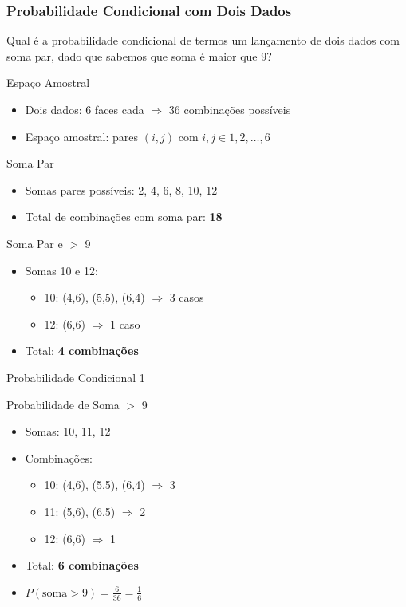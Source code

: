 \documentclass[11pt]{beamer}
\begin{document}
\begin{frame}
\frametitle{Probabilidade Condicional com Dois Dados}

Qual é a probabilidade condicional de termos um lançamento de dois dados com soma par, dado que sabemos que  soma é maior que 9?
\end{frame}

\begin{frame}{Espaço Amostral}
\begin{itemize}
\item Dois dados: 6 faces cada $\Rightarrow$ 36 combinações possíveis
\item Espaço amostral: pares $(i, j)$ com $i, j \in {1, 2, \ldots, 6}$
\end{itemize}
\end{frame}

\begin{frame}{Soma Par}
\begin{itemize}
\item Somas pares possíveis: 2, 4, 6, 8, 10, 12
\item Total de combinações com soma par: \textbf{18}
\end{itemize}
\end{frame}

\begin{frame}{Soma Par e $>$ 9}
\begin{itemize}
\item Somas 10 e 12:
\begin{itemize}
\item 10: (4,6), (5,5), (6,4) $\Rightarrow$ 3 casos
\item 12: (6,6) $\Rightarrow$ 1 caso
\end{itemize}
\item Total: \textbf{4 combinações}
\end{itemize}
\end{frame}

\begin{frame}{Probabilidade Condicional 1}



\end{frame}

\begin{frame}{Probabilidade de Soma $>$ 9}
\begin{itemize}
\item Somas: 10, 11, 12
\item Combinações:
\begin{itemize}
\item 10: (4,6), (5,5), (6,4) $\Rightarrow$ 3
\item 11: (5,6), (6,5) $\Rightarrow$ 2
\item 12: (6,6) $\Rightarrow$ 1
\end{itemize}
\item Total: \textbf{6 combinações}
\item $P(\text{soma} > 9) = \frac{6}{36} = \frac{1}{6}$
\end{itemize}
\end{frame}
\end{document}
